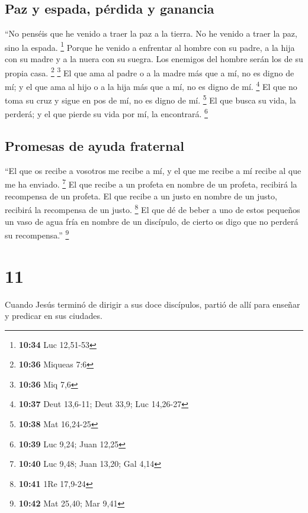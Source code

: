 \hypertarget{paz-y-espada-puxe9rdida-y-ganancia}{%
\subsection{Paz y espada, pérdida y
ganancia}\label{paz-y-espada-puxe9rdida-y-ganancia}}

 ``No penséis que he venido a traer la paz a la tierra.
No he venido a traer la paz, sino la espada. \footnote{\textbf{10:34}
  Luc 12,51-53}  Porque he venido a enfrentar al hombre
con su padre, a la hija con su madre y a la nuera con su suegra.
 Los enemigos del hombre serán los de su propia casa.
\footnote{\textbf{10:36} Miqueas 7:6} \footnote{\textbf{10:36} Miq 7,6}
 El que ama al padre o a la madre más que a mí, no es
digno de mí; y el que ama al hijo o a la hija más que a mí, no es digno
de mí. \footnote{\textbf{10:37} Deut 13,6-11; Deut 33,9; Luc 14,26-27}
 El que no toma su cruz y sigue en pos de mí, no es digno
de mí. \footnote{\textbf{10:38} Mat 16,24-25}  El que
busca su vida, la perderá; y el que pierde su vida por mí, la
encontrará. \footnote{\textbf{10:39} Luc 9,24; Juan 12,25}

\hypertarget{promesas-de-ayuda-fraternal}{%
\subsection{Promesas de ayuda
fraternal}\label{promesas-de-ayuda-fraternal}}

 ``El que os recibe a vosotros me recibe a mí, y el que
me recibe a mí recibe al que me ha enviado. \footnote{\textbf{10:40} Luc
  9,48; Juan 13,20; Gal 4,14}  El que recibe a un profeta
en nombre de un profeta, recibirá la recompensa de un profeta. El que
recibe a un justo en nombre de un justo, recibirá la recompensa de un
justo. \footnote{\textbf{10:41} 1Re 17,9-24}  El que dé
de beber a uno de estos pequeños un vaso de agua fría en nombre de un
discípulo, de cierto os digo que no perderá su recompensa.'' \footnote{\textbf{10:42}
  Mat 25,40; Mar 9,41}

\hypertarget{section-10}{%
\section{11}\label{section-10}}

 Cuando Jesús terminó de dirigir a sus doce discípulos,
partió de allí para enseñar y predicar en sus ciudades.

